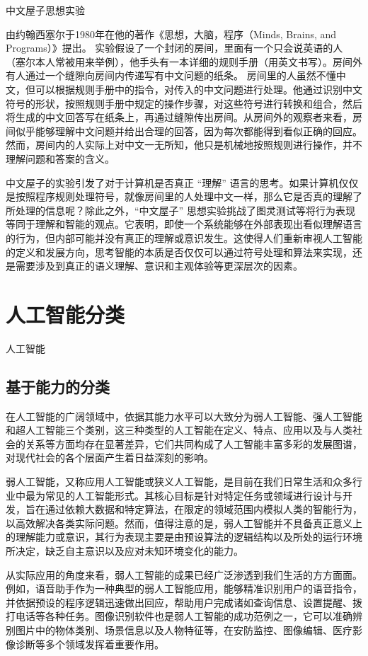 中文屋子思想实验


由约翰西塞尔于1980年在他的著作《思想，大脑，程序（Minds, Brains, and Programs）》提出。
实验假设了一个封闭的房间，里面有一个只会说英语的人（塞尔本人常被用来举例），他手头有一本详细的规则手册（用英文书写）。房间外有人通过一个缝隙向房间内传递写有中文问题的纸条。
房间里的人虽然不懂中文，但可以根据规则手册中的指令，对传入的中文问题进行处理。他通过识别中文符号的形状，按照规则手册中规定的操作步骤，对这些符号进行转换和组合，然后将生成的中文回答写在纸条上，再通过缝隙传出房间。从房间外的观察者来看，房间似乎能够理解中文问题并给出合理的回答，因为每次都能得到看似正确的回应。然而，房间内的人实际上对中文一无所知，他只是机械地按照规则进行操作，并不理解问题和答案的含义。


中文屋子的实验引发了对于计算机是否真正 “理解” 语言的思考。如果计算机仅仅是按照程序规则处理符号，就像房间里的人处理中文一样，那么它是否真的理解了所处理的信息呢？除此之外，“中文屋子” 思想实验挑战了图灵测试等将行为表现等同于理解和智能的观点。它表明，即使一个系统能够在外部表现出看似理解语言的行为，但内部可能并没有真正的理解或意识发生。这使得人们重新审视人工智能的定义和发展方向，思考智能的本质是否仅仅可以通过符号处理和算法来实现，还是需要涉及到真正的语义理解、意识和主观体验等更深层次的因素。


\section{人工智能分类}
人工智能


\subsection{基于能力的分类}
在人工智能的广阔领域中，依据其能力水平可以大致分为弱人工智能、强人工智能和超人工智能三个类别，这三种类型的人工智能在定义、特点、应用以及与人类社会的关系等方面均存在显著差异，它们共同构成了人工智能丰富多彩的发展图谱，对现代社会的各个层面产生着日益深刻的影响。



弱人工智能，又称应用人工智能或狭义人工智能，是目前在我们日常生活和众多行业中最为常见的人工智能形式。其核心目标是针对特定任务或领域进行设计与开发，旨在通过依赖大数据和特定算法，在限定的领域范围内模拟人类的智能行为，以高效解决各类实际问题。然而，值得注意的是，弱人工智能并不具备真正意义上的理解能力或意识，其行为表现主要是由预设算法的逻辑结构以及所处的运行环境所决定，缺乏自主意识以及应对未知环境变化的能力。


从实际应用的角度来看，弱人工智能的成果已经广泛渗透到我们生活的方方面面。例如，语音助手作为一种典型的弱人工智能应用，能够精准识别用户的语音指令，并依据预设的程序逻辑迅速做出回应，帮助用户完成诸如查询信息、设置提醒、拨打电话等各种任务。图像识别软件也是弱人工智能的成功范例之一，它可以准确辨别图片中的物体类别、场景信息以及人物特征等，在安防监控、图像编辑、医疗影像诊断等多个领域发挥着重要作用。


